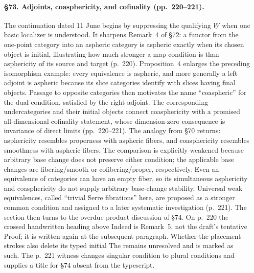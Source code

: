 \paragraph{\S73. Adjoints, coasphericity, and cofinality (pp.\ 220--221).}
The continuation dated 11 June begins by suppressing the qualifying $\underline W$ when one basic localizer is understood. It sharpens Remark~4 of \S72: a functor from the one-point category into an aspheric category is aspheric exactly when its chosen object is initial, illustrating how much stronger a map condition is than asphericity of its source and target (p.\ 220). Proposition~4 enlarges the preceding isomorphism example: every equivalence is aspheric, and more generally a left adjoint is aspheric because its slice categories identify with slices having final objects. Passage to opposite categories then motivates the name ``coaspheric'' for the dual condition, satisfied by the right adjoint. The corresponding undercategories and their initial objects connect coasphericity with a promised all-dimensional cofinality statement, whose dimension-zero consequence is invariance of direct limits (pp.\ 220--221). The analogy from \S70 returns: asphericity resembles properness with aspheric fibers, and coasphericity resembles smoothness with aspheric fibers. The comparison is explicitly weakened because arbitrary base change does not preserve either condition; the applicable base changes are fibering/smooth or cofibering/proper, respectively. Even an equivalence of categories can have an empty fiber, so its simultaneous asphericity and coasphericity do not supply arbitrary base-change stability. Universal weak equivalences, called ``trivial Serre fibrations'' here, are proposed as a stronger common condition and assigned to a later systematic investigation (p.\ 221). The section then turns to the overdue product discussion of \S74. On p.\ 220 the crossed handwritten heading above Indeed is Remark~5, not the draft's tentative Proof; it is written again at the subsequent paragraph. Whether the placement strokes also delete its typed initial The remains unresolved and is marked as such. The p.\ 221 witness changes singular condition to plural conditions and supplies a title for \S74 absent from the typescript.

